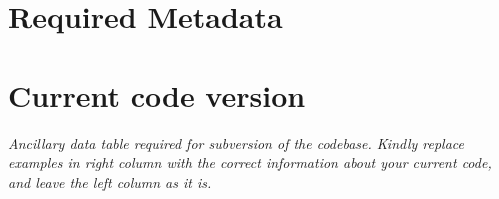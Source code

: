 \documentclass[preprint,12pt, a4paper]{elsarticle}
\begin{document}
\section*{Required Metadata}\label{sec:metadata}


\section*{Current code version}\label{sec:src_version}

{\em Ancillary data table required for subversion of the codebase. Kindly
replace examples in right column with the correct information about your
current code, and leave the left column as it is.

}
\end{document}
